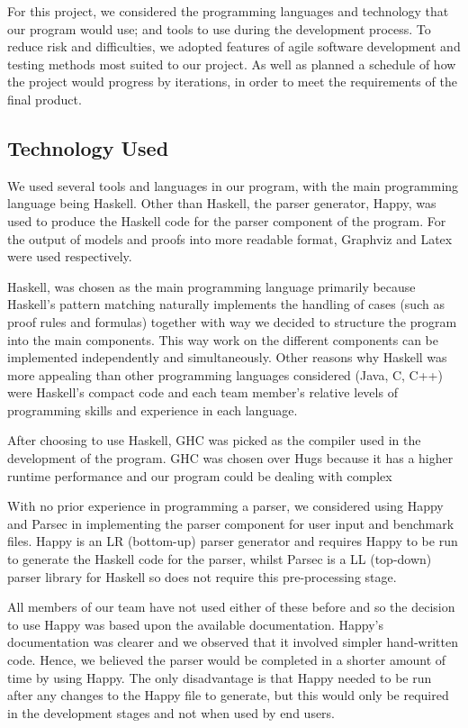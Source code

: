 For this project, we considered the programming languages and technology that our program would use; and tools to use during the development process. To reduce risk and difficulties, we adopted features of agile software development and testing methods most suited to our project. As well as planned a schedule of how the project would progress by iterations, in order to meet the requirements of the final product.

\subsection{Technology Used}

We used several tools and languages in our program, with the main programming language being Haskell. Other than Haskell, the parser generator, Happy, was used to produce the Haskell code for the parser component of the program. For the output of models and proofs into more readable format, Graphviz and Latex were used respectively.

Haskell, was chosen as the main programming language primarily because Haskell's pattern matching naturally implements the handling of cases (such as proof rules and formulas) together with way we decided to structure the program into the main components. This way work on the different components can be implemented independently and simultaneously. Other reasons why Haskell was more appealing than other programming languages considered (Java, C, C++) were Haskell's compact code and each team member's relative levels of programming skills and experience in each language.

After choosing to use Haskell, GHC was picked as the compiler used in the development of the program. GHC was chosen over Hugs because it has a higher runtime performance and our program could be dealing with complex 

With no prior experience in programming a parser, we considered using Happy and Parsec in implementing the parser component for user input and benchmark files. Happy is an LR (bottom-up) parser generator and requires Happy to be run to generate the Haskell code for the parser, whilst Parsec is a LL (top-down) parser library for Haskell so does not require this pre-processing stage.

All members of our team have not used either of these before and so the decision to use Happy was based upon the available documentation. Happy's documentation was clearer and we observed that it involved simpler hand-written code. Hence, we believed the parser would be completed in a shorter amount of time by using Happy. The only disadvantage is that Happy needed to be run after any changes to the Happy file to generate, but this would only be required in the development stages and not when used by end users.


